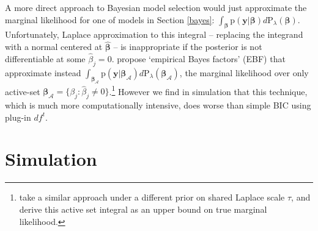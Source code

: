 \documentclass[12pt]{article}
\newcommand{\bs}[1]{\boldsymbol{#1}}
\newcommand{\mc}[1]{\mathcal{#1}}
\newcommand{\mr}[1]{\mathrm{#1}}
\newcommand{\bm}[1]{\mathbf{#1}}
\begin{document}
A more direct approach to Bayesian model selection would just approximate the
marginal likelihood for one of models in Section \ref{bayes}:
$\int_{\bs{\beta}} \mr{p}( \bm{y} | \bs{\beta} ) d\mr{P}_\lambda(\bs{\beta})$.
Unfortunately, Laplace approximation to this integral -- replacing the
integrand with a normal centered at  $\bs{\hat\beta}$ --  is inappropriate if
the posterior is not differentiable at some $\hat\beta_j=0$.
\citet{zhou_path_2012} propose  `empirical Bayes factors' (EBF) that
approximate instead $\int_{\bs{\beta}_\mc{A}} \mr{p}( \bm{y} |
\bs{\beta}_\mc{A} ) d\mr{P}_\lambda(\bs{\beta}_\mc{A})$, the marginal
likelihood over only active-set $\bs{\beta}_\mc{A} = \{\beta_j: \hat\beta_j
\neq 0\}$.\footnote{\citet{yuan_efficient_2005} take a similar approach under
a different prior on shared Laplace scale $\tau$, and derive this active set
integral as an upper bound on true marginal likelihood.} However we find in
simulation that this technique, which is much more computationally intensive,
does worse than simple BIC using plug-in $df^t$.

\section{Simulation}
\label{sim}
\end{document}
